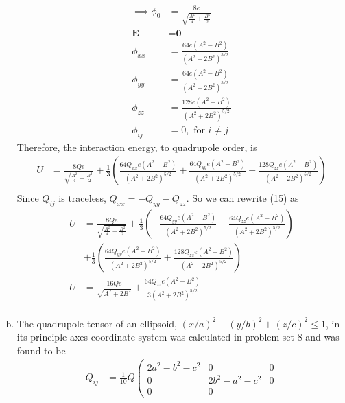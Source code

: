 \documentclass[]{article}
\begin{document}
\begin{enumerate}[a)]
\begin{equation}
\begin{split}
\implies \phi_0 & = \frac{8e}{\sqrt{ \frac{A^2}{4} + \frac{B^2}{2} }} \\
\textbf{E} & = \textbf{0} \\
\phi_{xx} & = \frac{64e(A^2 - B^2)}{(A^2 + 2B^2)^{5/2}} \\
\phi_{yy} & = \frac{64e(A^2 - B^2)}{(A^2 + 2B^2)^{5/2}} \\
\phi_{zz} & = \frac{128e(A^2 - B^2)}{(A^2 + 2B^2)^{5/2}} \\
\phi_{ij} & = 0, \text{	for $i\ne j$}
\end{split}
\end{equation}
Therefore, the interaction energy, to quadrupole order, is
\begin{equation}
\begin{split}
U & = \frac{8Qe}{\sqrt{ \frac{A^2}{4} + \frac{B^2}{2} }} + \frac{1}{3}\left(   \frac{64Q_{xx}e(A^2 - B^2)}{(A^2 + 2B^2)^{5/2}}   +   \frac{64Q_{yy}e(A^2 - B^2)}{(A^2 + 2B^2)^{5/2}}   +  \frac{128Q_{zz}e(A^2 - B^2)}{(A^2 + 2B^2)^{5/2}}  \right) \\
\end{split}
\end{equation}
Since $Q_{ij}$ is traceless, $ Q_{xx} = - Q_{yy} - Q_{zz}$. So we can rewrite (15) as
\begin{equation}
\begin{split}
U & = \frac{8Qe}{\sqrt{ \frac{A^2}{4} + \frac{B^2}{2} }} + \frac{1}{3}\left(   - \frac{64Q_{yy}e(A^2 - B^2)}{(A^2 + 2B^2)^{5/2}}  - \frac{64Q_{zz}e(A^2 - B^2)}{(A^2 + 2B^2)^{5/2}} \right) \\ &   +  \frac{1}{3}\left( \frac{64Q_{yy}e(A^2 - B^2)}{(A^2 + 2B^2)^{5/2}}   +  \frac{128Q_{zz}e(A^2 - B^2)}{(A^2 + 2B^2)^{5/2}}  \right) \\
U  & = \frac{16Qe}{\sqrt{ A^2+ 2B^2 }} +  \frac{64Q_{zz}e(A^2 - B^2)}{3(A^2 + 2B^2)^{5/2}}  \\
\end{split}
\end{equation}
\item The quadrupole tensor of an ellipsoid, $(x/a)^2 + (y/b)^2 + (z/c)^2 \leq 1$, in its principle axes coordinate system was calculated in problem set 8 and was found to be
\begin{equation}
\begin{split}
Q_{ij} & = 
\frac{1}{10}  Q\left(
\begin{array}{ccc}
   2
   a^2-b^2-c^2 & 0 & 0 \\
 0 &  2 b^2-a^2-c^2 & 0 \\
 0 & 0 &  

\end{array}
\end{split}
\end{equation}
\end{enumerate}
\end{document}
